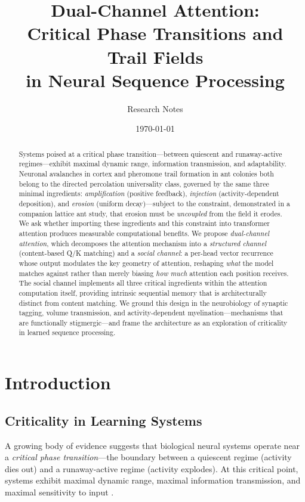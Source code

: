 \documentclass[11pt,a4paper]{article}
\title{Dual-Channel Attention:\\
Critical Phase Transitions and Trail Fields\\
in Neural Sequence Processing}
\author{Research Notes}
\date{\today}
\begin{document}
\maketitle

\begin{abstract}
Systems poised at a critical phase transition---between quiescent and
runaway-active regimes---exhibit maximal dynamic range, information
transmission, and adaptability.  Neuronal avalanches in cortex and
pheromone trail formation in ant colonies both belong to the directed
percolation universality class, governed by the same three minimal
ingredients: \emph{amplification} (positive feedback),
\emph{injection} (activity-dependent deposition), and \emph{erosion}
(uniform decay)---subject to the constraint, demonstrated in a
companion lattice ant study, that erosion must be \emph{uncoupled}
from the field it erodes.  We ask whether importing these ingredients
and this constraint into transformer attention produces measurable
computational benefits.  We
propose \emph{dual-channel attention}, which decomposes the attention
mechanism into a \emph{structured channel} (content-based Q/K
matching) and a \emph{social channel}: a per-head vector recurrence
whose output modulates the key geometry of attention, reshaping
\emph{what} the model matches against rather than merely biasing
\emph{how much} attention each position receives.  The social channel
implements all three critical ingredients within the attention
computation itself, providing intrinsic sequential memory that is
architecturally distinct from content matching.  We ground this
design in the neurobiology of synaptic tagging, volume transmission,
and activity-dependent myelination---mechanisms that are functionally
stigmergic---and frame the architecture as an exploration of
criticality in learned sequence processing.
\end{abstract}


\section{Introduction}
\label{sec:intro}

\subsection{Criticality in Learning Systems}

A growing body of evidence suggests that biological neural systems
operate near a \emph{critical phase transition}---the boundary between
a quiescent regime (activity dies out) and a runaway-active regime
(activity explodes).  At this critical point, systems exhibit maximal
dynamic range, maximal information transmission, and maximal
sensitivity to input \cite{beggs2003,shew2013,chialvo2010}.
\end{document}
